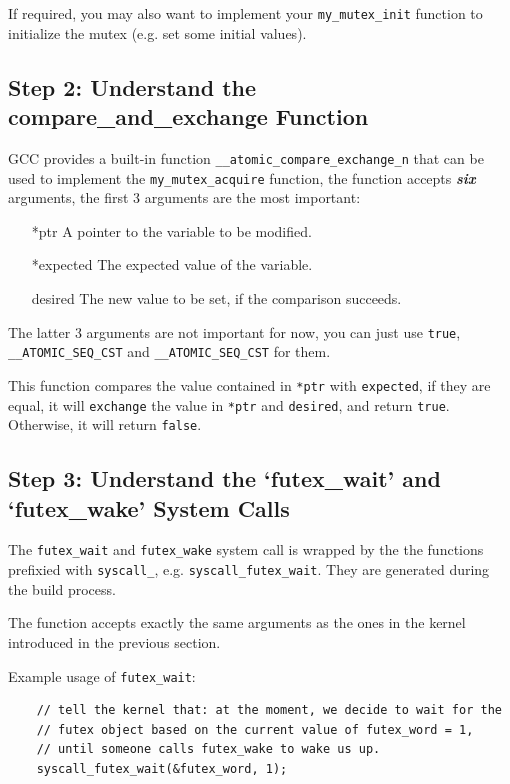 If required, you may also want to implement your \texttt{my\_mutex\_init} function to initialize
the mutex (e.g. set some initial values).

\subsection{Step 2: Understand the compare\_and\_exchange Function}

GCC provides a built-in function \texttt{\_\_atomic\_compare\_exchange\_n} that
can be used to implement the \texttt{my\_mutex\_acquire} function, the function accepts
\textit{\textbf{six}} arguments, the first 3 arguments are the most important:

\begin{itemize}
    \item[*ptr] A pointer to the variable to be modified.
    \item[*expected] The expected value of the variable.
    \item[desired] The new value to be set, if the comparison succeeds.
\end{itemize}

The latter 3 arguments are not important for now, you can just use \texttt{true},
\texttt{\_\_ATOMIC\_SEQ\_CST} and \texttt{\_\_ATOMIC\_SEQ\_CST} for them.

This function compares the value contained in \texttt{*ptr} with \texttt{expected}, if they
are equal, it will \texttt{exchange} the value in \texttt{*ptr} and \texttt{desired}, and
return \texttt{true}. Otherwise, it will return \texttt{false}.

\subsection{Step 3: Understand the `futex\_wait' and `futex\_wake' System Calls}

The \texttt{futex\_wait} and \texttt{futex\_wake} system call is wrapped by the
the functions prefixied with \texttt{syscall\_}, e.g. \texttt{syscall\_futex\_wait}.
They are generated during the build process.

The function accepts exactly the same arguments as the ones in the kernel introduced
in the previous section.

Example usage of \texttt{futex\_wait}:

\begin{verbatim}
    // tell the kernel that: at the moment, we decide to wait for the
    // futex object based on the current value of futex_word = 1,
    // until someone calls futex_wake to wake us up.
    syscall_futex_wait(&futex_word, 1);
\end{verbatim}

